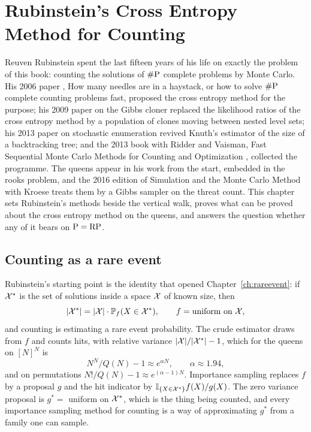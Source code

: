 \chapter{Rubinstein's Cross Entropy Method for Counting}
\label{ch:ce}

Reuven Rubinstein spent the last fifteen years of his life on exactly the problem of this book: counting the solutions of $\#\mathrm{P}$ complete problems by Monte Carlo. His 2006 paper \cite{Rubinstein2006}, How many needles are in a haystack, or how to solve $\#\mathrm{P}$ complete counting problems fast, proposed the cross entropy method for the purpose; his 2009 paper on the Gibbs cloner \cite{Rubinstein2009} replaced the likelihood ratios of the cross entropy method by a population of clones moving between nested level sets; his 2013 paper on stochastic enumeration \cite{Rubinstein2013} revived Knuth's estimator of the size of a backtracking tree; and the 2013 book with Ridder and Vaisman, Fast Sequential Monte Carlo Methods for Counting and Optimization \cite{RRV}, collected the programme. The queens appear in his work from the start, embedded in the rooks problem, and the 2016 edition of Simulation and the Monte Carlo Method with Kroese \cite{RubinsteinKroese} treats them by a Gibbs sampler on the threat count. This chapter sets Rubinstein's methods beside the vertical walk, proves what can be proved about the cross entropy method on the queens, and answers the question whether any of it bears on $\mathrm{P} = \mathrm{RP}$.

\section{Counting as a rare event}

Rubinstein's starting point is the identity that opened Chapter~\ref{ch:rareevent}: if $\mathcal{X}^*$ is the set of solutions inside a space $\mathcal{X}$ of known size, then
\[
|\mathcal{X}^*| = |\mathcal{X}| \cdot \mathbb{P}_f( X \in \mathcal{X}^* ), \qquad f = \text{uniform on } \mathcal{X} ,
\]
and counting is estimating a rare event probability. The crude estimator draws from $f$ and counts hits, with relative variance $|\mathcal{X}| / |\mathcal{X}^*| - 1$, which for the queens on $[N]^N$ is
\[
N^N / Q(N) - 1 \approx e^{\alpha N}, \qquad \alpha \approx 1.94 ,
\]
and on permutations $N! / Q(N) - 1 \approx e^{(\alpha - 1) N}$. Importance sampling replaces $f$ by a proposal $g$ and the hit indicator by $\mathbb{I}_{\{X \in \mathcal{X}^*\}} f(X) / g(X)$. The zero variance proposal is $g^* = $ uniform on $\mathcal{X}^*$, which is the thing being counted, and every importance sampling method for counting is a way of approximating $g^*$ from a family one can sample.

